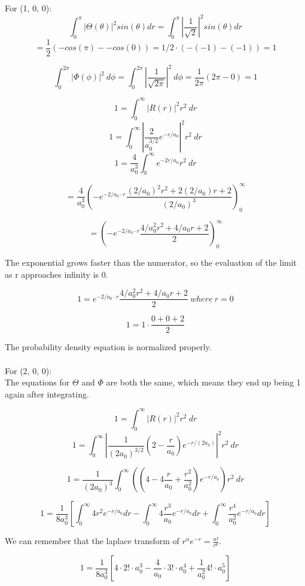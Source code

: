 \documentclass{article}
\begin{document}
For (1, 0, 0): \\
$$ \int_0^\pi |\Theta(\theta)|^2 sin(\theta) dr 
= \int_0^\pi \left|\frac{1}{\sqrt{2}}\right|^2 sin(\theta) dr $$
$$ = \frac{1}{2} (-cos(\pi) - -cos(0)) = 1/2 \cdot (-(-1) - (-1)) =  1 $$

$$ \int_0^{2\pi} \left|\Phi(\phi)\right|^2\ d\phi 
 = \int_0^{2\pi} \left|\frac{1}{\sqrt{2\pi}}\right|^2\ d\phi 
 = \frac{1}{2\pi} (2\pi - 0) = 1 $$

$$ 1 = \int_0^\infty |R(r)|^2 r^2\ dr $$
$$ 1 = \int_0^\infty \left|\frac{2}{a_0^{3/2}}e^{-r/a_0}\right|^2 r^2\ dr $$
$$ 1 = \frac{4}{a_0^{3}} \int_0^\infty 
e^{-2r/a_0} r^2\ dr $$

$$ = \frac{4}{a_0^{3}} 
\left( 
-e^{-2/a_0 \cdot r} 
\frac{(2/a_0)^2r^2 + 2(2/a_0)r + 2}
{(2/a_0)^3} 
\right)^\infty_0 $$


$$ =
\left( 
-e^{-2/a_0 \cdot r} 
\frac{4/a_0^2r^2 + 4/a_0r + 2}
{2} 
\right)^\infty_0 $$

The exponential grows faster than the numerator, so the evaluation of the limit as r approaches infinity is 0.

$$ 1 = e^{-2/a_0 \cdot r} 
\frac{4/a_0^2r^2 + 4/a_0r + 2}
{2} \ where\ r=0 $$


$$ 1 = 1 \cdot 
\frac{0 + 0 + 2}
{2} $$

The probability density equation is normalized properly. \\
\\

\newpage
For (2, 0, 0):\\
The equations for $\Theta$ and $\Phi$ are both the same, which means they end up being 1 again after integrating.

$$ 1 = \int_0^\infty |R(r)|^2 r^2\ dr $$
$$ 1 = \int_0^\infty 
\left|\frac{1}{(2a_0)^{3/2}}
	\left(2 - \frac{r}{a_0} \right) 
	e^{-r/(2a_0)} 
\right|^2 r^2\ dr $$

$$ 1 = \frac{1}{(2a_0)^{3}} \int_0^\infty 
\left(
	\left(4 - 4\frac{r}{a_0} + \frac{r^2}{a_0^2} \right) 
	e^{-r/a_0} 
\right) r^2\ dr $$

$$ 1 = \frac{1}{8a_0^{3}} \left[
\int_0^\infty 4r^2 e^{-r/a_0} dr
-
\int_0^\infty 4\frac{r^3}{a_0} e^{-r/a_0} dr
+
\int_0^\infty \frac{r^4}{a_0^2} e^{-r/a_0} dr
\right] $$

We can remember that the laplace transform of $r^n e^{-r} = \frac{n!}{c^6}$.

$$ 1 = \frac{1}{8a_0^{3}} \left[
4 \cdot 2! \cdot a_0^3
-
\frac{4}{a_0} \cdot 3! \cdot a_0^4
+
\frac{1}{a_0^2}4! \cdot a_0^5
\right] $$
\end{document}
